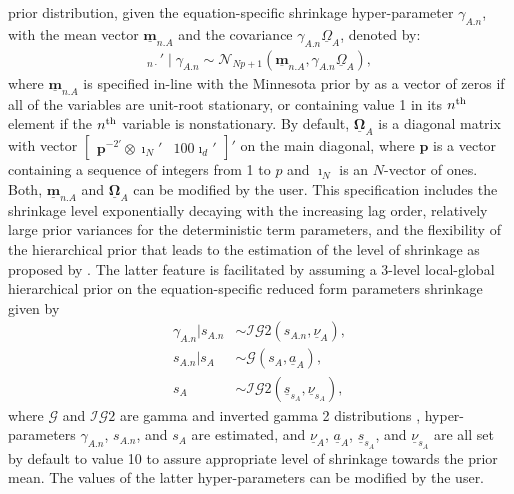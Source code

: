 \documentclass[
  nojss]{jss}
\begin{document}
prior distribution, given the equation-specific shrinkage
hyper-parameter \(\gamma_{A.n}\), with the mean vector
\(\underline{\mathbf{m}}_{n.A}\) and the covariance
\(\gamma_{A.n}\underline{\Omega}_A\), denoted by: \begin{align}
[\mathbf{A}]_{n\cdot}'\mid\gamma_{A.n} \sim\mathcal{N}_{Np+1}\left( \underline{\mathbf{m}}_{n.A}, \gamma_{A.n}\underline{\Omega}_A \right),
\end{align} where \(\underline{\mathbf{m}}_{n.A}\) is specified in-line
with the Minnesota prior by \cite{Doan1984} as a vector of zeros if all
of the variables are unit-root stationary, or containing value 1 in its
\(n\textsuperscript{th}\) element if the \(n\textsuperscript{th}\)
variable is nonstationary. By default,
\(\underline{\boldsymbol{\Omega}}_A\) is a diagonal matrix with vector
\(\begin{bmatrix}\mathbf{p}^{-2\prime}\otimes\boldsymbol{\imath}_N' & 100\boldsymbol{\imath}_d'\end{bmatrix}'\)
on the main diagonal, where \(\mathbf{p}\) is a vector containing a
sequence of integers from 1 to \(p\) and \(\boldsymbol\imath_N\) is an
\(N\)-vector of ones. Both, \(\underline{\mathbf{m}}_{n.A}\) and
\(\underline{\boldsymbol{\Omega}}_A\) can be modified by the user. This
specification includes the shrinkage level exponentially decaying with
the increasing lag order, relatively large prior variances for the
deterministic term parameters, and the flexibility of the hierarchical
prior that leads to the estimation of the level of shrinkage as proposed
by \cite{Giannone2015}. The latter feature is facilitated by assuming a
3-level local-global hierarchical prior on the equation-specific reduced
form parameters shrinkage given by \begin{align}
\gamma_{A.n} | s_{A.n}  &\sim\mathcal{IG}2\left(s_{A.n}, \underline{\nu}_A\right),\\
s_{A.n} | s_{A} &\sim\mathcal{G}\left(s_{A}, \underline{a}_A\right),\\
s_{A} &\sim\mathcal{IG}2\left(\underline{s}_{s_A}, \underline{\nu}_{s_A}\right),
\end{align} where \(\mathcal{G}\) and \(\mathcal{IG}2\) are gamma and
inverted gamma 2 distributions \citep[see][Appendix A]{Bauwens1999},
hyper-parameters \(\gamma_{A.n}\), \(s_{A.n}\), and \(s_{A}\) are
estimated, and \(\underline{\nu}_A\), \(\underline{a}_A\),
\(\underline{s}_{s_A}\), and \(\underline{\nu}_{s_A}\) are all set by
default to value 10 to assure appropriate level of shrinkage towards the
prior mean. The values of the latter hyper-parameters can be modified by
the user.
\end{document}

